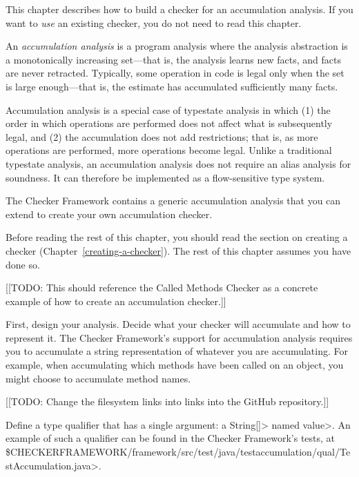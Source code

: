 \htmlhr
{}


This chapter describes how to build a checker for an accumulation analysis.
If you want to \emph{use} an existing checker, you do not need to read this chapter.

An \emph{accumulation analysis} is a program analysis where the
analysis abstraction is a monotonically increasing set---that is, the
analysis learns new facts, and facts are never retracted.
Typically, some operation in code is legal
only when the set is large enough---that is, the estimate has accumulated
sufficiently many facts.

Accumulation analysis is a special case of typestate analysis in which
(1) the order in which operations are performed does not affect what is subsequently legal,
and (2) the accumulation does not add restrictions; that is, as
more operations are performed, more operations become legal.
Unlike a traditional typestate analysis, an accumulation analysis does
not require an alias analysis for soundness. It can therefore be implemented
as a flow-sensitive type system.

The Checker Framework contains a generic accumulation analysis that you can
extend to create your own accumulation checker.

Before reading the rest of this chapter, you should
read the section on creating a checker (Chapter~\ref{creating-a-checker}).
The rest of this chapter assumes you have done so.



[[TODO: This should reference the Called Methods Checker as a concrete
example of how to create an accumulation checker.]]

First, design your analysis.  Decide what
your checker will accumulate and how to represent it. The Checker Framework's
support for accumulation analysis requires you to accumulate a string representation
of whatever you are accumulating. For example, when accumulating which methods have
been called on an object, you might choose to accumulate method names.

[[TODO: Change the filesystem links into links into the GitHub repository.]]

Define a type qualifier that has a single argument: a \<String[]> named \<value>.
An example of such a qualifier can be found in the Checker Framework's tests, at
\<\$CHECKERFRAMEWORK/framework/src/test/java/testaccumulation/qual/TestAccumulation.java>.

